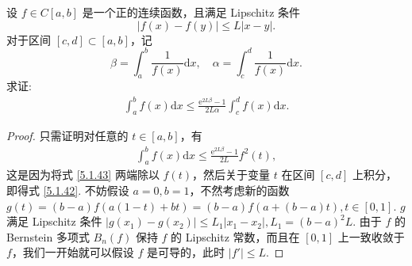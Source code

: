 \documentclass[../../main.tex]{subfiles}%
\begin{document}
\begin{example}
设 $f \in C[a,b]$ 是一个正的连续函数，且满足 Lipschitz 条件
$$|f(x) - f(y)| \leqslant L|x - y|.$$
对于区间 $[c,d] \subset [a,b]$，记
$$\beta = \int_a^b \frac{1}{f(x)} \mathrm{d}x, \quad \alpha = \int_c^d \frac{1}{f(x)} \mathrm{d}x.$$
求证:
\begin{align}
\int_a^b f(x) \mathrm{d}x \leqslant \frac{\mathrm{e}^{2L\beta} - 1}{2L\alpha} \int_c^d f(x) \mathrm{d}x. \label{5.1.42}
\end{align}
\end{example}
\begin{proof}

只需证明对任意的 $t \in [a,b]$，有
\begin{align}
\int_a^b f(x) \mathrm{d}x \leqslant \frac{\mathrm{e}^{2L\beta} - 1}{2L} f^2(t), \label{5.1.43}
\end{align}
这是因为将式 \eqref{5.1.43} 两端除以 $f(t)$，然后关于变量 $t$ 在区间 $[c,d]$ 上积分，即得式 \eqref{5.1.42}. 不妨假设 $a = 0, b = 1$，不然考虑新的函数 $g(t) =(b - a)f(a(1-t) + bt)= (b - a)f(a + (b - a)t), t \in [0,1]$. $g$ 满足 Lipschitz 条件 $|g(x_1) - g(x_2)| \leqslant L_1|x_1 - x_2|, L_1 = (b - a)^2L$. 由于 $f$ 的 Bernstein 多项式 $B_n(f)$ 保持 $f$ 的 Lipschitz 常数，而且在 $[0,1]$ 上一致收敛于 $f$，我们一开始就可以假设 $f$ 是可导的，此时 $|f'| \leqslant L$.


\end{proof}
\end{document}

